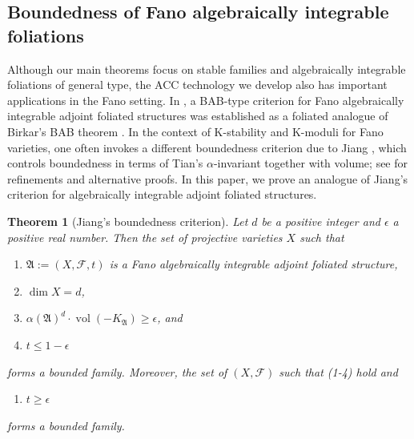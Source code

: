 \documentclass[11pt,reqno]{amsart}
\numberwithin{equation}{section}
\newcommand{\vol}{\operatorname{vol}}
\newcommand{\Aa}{{\mathfrak{A}}}
\newcommand{\Ff}{\mathcal{F}}
\newtheorem{alphthm}{Theorem}
\theoremstyle{definition}
\begin{document}
\subsection{Boundedness of Fano algebraically integrable foliations}
Although our main theorems focus on stable families and algebraically integrable foliations of general type, the ACC technology we develop also has important applications in the Fano setting. In \cite{Cas+25a}, a BAB-type criterion for Fano algebraically integrable adjoint foliated structures was established as a foliated analogue of Birkar's BAB theorem \cite[Theorem~1.1]{Bir21a}. In the context of K-stability and K-moduli for Fano varieties, one often invokes a different boundedness criterion due to Jiang \cite[Theorem~1.6]{Jia20}, which controls boundedness in terms of Tian's $\alpha$-invariant together with volume; see \cite{Che20,LLX20} for refinements and alternative proofs. In this paper, we prove an analogue of Jiang's criterion for algebraically integrable adjoint foliated structures.

\begin{alphthm}[Jiang's boundedness criterion]\label{thm: jiang afs main}
Let $d$ be a positive integer and $\epsilon$ a positive real number. Then the set of projective varieties $X$ such that
\begin{enumerate}
    \item $\Aa:=(X,\Ff,t)$ is a Fano algebraically integrable adjoint foliated structure,
    \item $\dim X=d$,
    \item $\alpha(\Aa)^d\cdot\vol(-K_{\Aa})\geq\epsilon$, and
    \item $t\leq 1-\epsilon$
\end{enumerate}
forms a bounded family. 
Moreover, the set of $(X,\Ff)$ such that (1-4) hold and
\begin{enumerate}
    \item[(5)] $t\geq\epsilon$
\end{enumerate}
forms a bounded family.
\end{alphthm}
\end{document}
